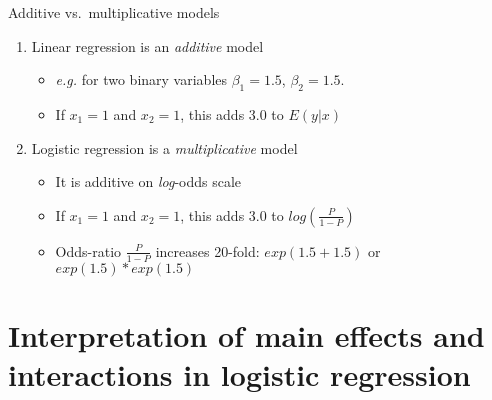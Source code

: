 \documentclass[
  ignorenonframetext,
]{beamer}
\providecommand{\tightlist}{%
  \setlength{\itemsep}{0pt}\setlength{\parskip}{0pt}}
\begin{document}
\begin{frame}{Additive vs.~multiplicative models}
\protect\hypertarget{additive-vs.-multiplicative-models}{}

\begin{enumerate}
\tightlist
\item
  Linear regression is an \emph{additive} model

  \begin{itemize}
  \tightlist
  \item
    \emph{e.g.} for two binary variables \(\beta_1 = 1.5\),
    \(\beta_2 = 1.5\).
  \item
    If \(x_1=1\) and \(x_2=1\), this adds 3.0 to \(E(y|x)\)
  \end{itemize}
\item
  Logistic regression is a \emph{multiplicative} model

  \begin{itemize}
  \tightlist
  \item
    It is additive on \emph{log}-odds scale
  \item
    If \(x_1=1\) and \(x_2=1\), this adds 3.0 to \(log(\frac{P}{1-P})\)
  \item
    Odds-ratio \(\frac{P}{1-P}\) increases 20-fold: \(exp(1.5+1.5)\) or
    \(exp(1.5) * exp(1.5)\)
  \end{itemize}
\end{enumerate}

\end{frame}

\hypertarget{interpretation-of-main-effects-and-interactions-in-logistic-regression}{%
\section{Interpretation of main effects and interactions in logistic
regression}\label{interpretation-of-main-effects-and-interactions-in-logistic-regression}}
\end{document}
